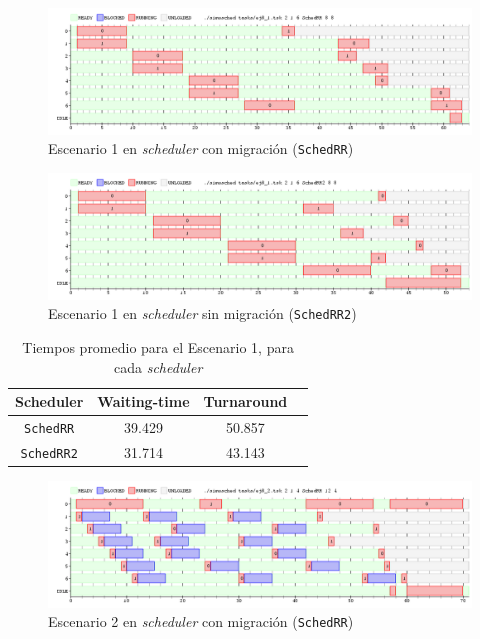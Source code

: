 \begin{figure}[H]
    \begin{center}
        \includegraphics[width=1\columnwidth]{imagenes/ej8_1_rr.png}
        \caption{Escenario 1 en \emph{scheduler} con migración (\texttt{SchedRR})}
    \end{center}
\end{figure}

\begin{figure}[H]
    \begin{center}
        \includegraphics[width=1\columnwidth]{imagenes/ej8_1_rr2.png}
        \caption{Escenario 1 en \emph{scheduler} sin migración (\texttt{SchedRR2})}
    \end{center}
\end{figure}

\begin{table}[H]
    \begin{center}
        \begin{tabular}{|c|c|c|c|}
            \hline
            \textbf{Scheduler} & \textbf{Waiting-time} & \textbf{Turnaround} \\ \hline
            \texttt{SchedRR}   & 39.429                & 50.857 \\
            \texttt{SchedRR2}  & 31.714                & 43.143 \\ \hline
        \end{tabular}
        \caption{Tiempos promedio para el Escenario 1, para cada \emph{scheduler}}
    \end{center}
\end{table}


\begin{figure}[H]
    \begin{center}
        \includegraphics[width=1\columnwidth]{imagenes/ej8_2_rr.png}
        \caption{Escenario 2 en \emph{scheduler} con migración (\texttt{SchedRR})}
    \end{center}
\end{figure}

